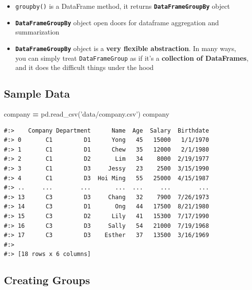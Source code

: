 \documentclass[
]{book}
\newenvironment{Shaded}{\begin{snugshade}}{\end{snugshade}}
\newcommand{\NormalTok}[1]{#1}
\newcommand{\OperatorTok}[1]{\textcolor[rgb]{0.43,0.43,0.43}{\textbf{#1}}}
\newcommand{\StringTok}[1]{\textcolor[rgb]{0.5,0.5,0.5}{#1}}
\providecommand{\tightlist}{%
  \setlength{\itemsep}{0pt}\setlength{\parskip}{0pt}}
\begin{document}
\begin{itemize}
\tightlist
\item
  \texttt{groupby()} is a DataFrame method, it returns \textbf{\texttt{DataFrameGroupBy}} object\\
\item
  \textbf{\texttt{DataFrameGroupBy}} object open doors for dataframe aggregation and summarization\\
\item
  \textbf{\texttt{DataFrameGroupBy}} object is a \textbf{very flexible abstraction}. In many ways, you can simply treat \texttt{DataFrameGroup} as if it's a \textbf{collection of DataFrames}, and it does the difficult things under the hood
\end{itemize}

\hypertarget{sample-data-14}{%
\subsection{Sample Data}\label{sample-data-14}}

\begin{Shaded}
\begin{Highlighting}[]
\NormalTok{company }\OperatorTok{=}\NormalTok{ pd.read_csv(}\StringTok{'data/company.csv'}\NormalTok{)}
\NormalTok{company}
\end{Highlighting}
\end{Shaded}

\begin{verbatim}
#:>    Company Department      Name  Age  Salary  Birthdate
#:> 0       C1         D1      Yong   45   15000   1/1/1970
#:> 1       C1         D1      Chew   35   12000   2/1/1980
#:> 2       C1         D2       Lim   34    8000  2/19/1977
#:> 3       C1         D3     Jessy   23    2500  3/15/1990
#:> 4       C1         D3  Hoi Ming   55   25000  4/15/1987
#:> ..     ...        ...       ...  ...     ...        ...
#:> 13      C3         D3     Chang   32    7900  7/26/1973
#:> 14      C3         D1       Ong   44   17500  8/21/1980
#:> 15      C3         D2      Lily   41   15300  7/17/1990
#:> 16      C3         D3     Sally   54   21000  7/19/1968
#:> 17      C3         D3    Esther   37   13500  3/16/1969
#:> 
#:> [18 rows x 6 columns]
\end{verbatim}

\hypertarget{creating-groups}{%
\subsection{Creating Groups}\label{creating-groups}}
\end{document}
